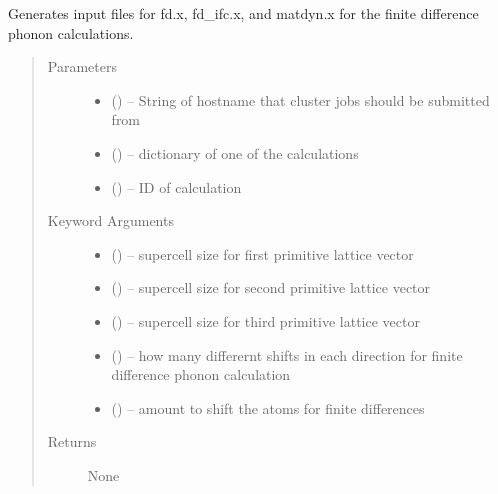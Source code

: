 \documentclass[letterpaper,10pt,english]{sphinxmanual}
\begin{document}
\begin{fulllineitems}
\label{\detokenize{run:run.prep_fd}}
Generates input files for fd.x, fd\_ifc.x, and matdyn.x for the finite
difference phonon calculations.
\begin{quote}\begin{description}
\item[{Parameters}] \leavevmode\begin{itemize}
\item {} 
 () -- String of hostname that cluster jobs should be submitted from

\item {} 
 () -- dictionary of one of the calculations

\item {} 
 () -- ID of calculation

\end{itemize}

\item[{Keyword Arguments}] \leavevmode\begin{itemize}
\item {} 
 () -- supercell size for first primitive lattice vector

\item {} 
 () -- supercell size for second primitive lattice vector

\item {} 
 () -- supercell size for third primitive lattice vector

\item {} 
 () -- how many differernt shifts in each direction for
finite difference phonon calculation

\item {} 
 () -- amount to shift the atoms for finite differences

\end{itemize}

\item[{Returns}] \leavevmode
None

\end{description}\end{quote}

\end{fulllineitems}
\end{document}
